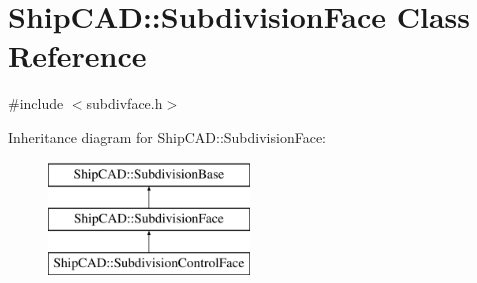 \hypertarget{classShipCAD_1_1SubdivisionFace}{\section{Ship\-C\-A\-D\-:\-:Subdivision\-Face Class Reference}
\label{classShipCAD_1_1SubdivisionFace}
}


{\ttfamily \#include $<$subdivface.\-h$>$}

Inheritance diagram for Ship\-C\-A\-D\-:\-:Subdivision\-Face\-:\begin{figure}[H]
\begin{center}
\leavevmode
\includegraphics[height=3.000000cm]{classShipCAD_1_1SubdivisionFace}
\end{center}
\end{figure}
